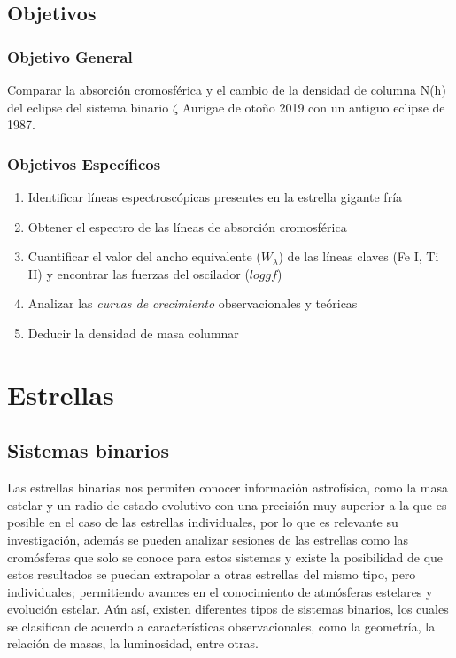 \documentclass[12pt,oneside,openany,letter]{book}
\begin{document}
\section{Objetivos}

\subsection{Objetivo General}

Comparar la absorción cromosférica y el cambio de la densidad de columna N(h) del eclipse del sistema binario $\zeta$ Aurigae de otoño 2019 con un antiguo eclipse de 1987.


\subsection{Objetivos Espec\'ificos}
\begin{enumerate}
    \item Identificar líneas espectroscópicas presentes en la estrella gigante fría
    \item Obtener el espectro de las líneas de absorción cromosférica
    \item Cuantificar el valor del ancho equivalente ($W_{\lambda}$) de las líneas claves (Fe I, Ti II)  y encontrar las fuerzas del oscilador ($loggf$)

    \item Analizar las \textit{curvas de crecimiento} observacionales y teóricas

    \item Deducir la densidad de masa columnar
\end{enumerate}


\chapter{Estrellas}\label{cap2}

\section{Sistemas binarios}

Las estrellas binarias nos permiten conocer información astrofísica, como la masa estelar y un radio de estado evolutivo con una precisión muy superior a la que es posible en el caso de las estrellas individuales, por lo que es relevante su investigación, además se pueden analizar sesiones de las estrellas como las cromósferas que solo se conoce para estos sistemas y existe la posibilidad de que estos resultados se puedan extrapolar a otras estrellas del mismo tipo, pero individuales; permitiendo avances en el conocimiento de atmósferas estelares y evolución estelar. Aún así, existen diferentes tipos de sistemas binarios, los cuales se clasifican de acuerdo a características observacionales, como la geometría, la relación de masas, la luminosidad, entre otras.
\end{document}
